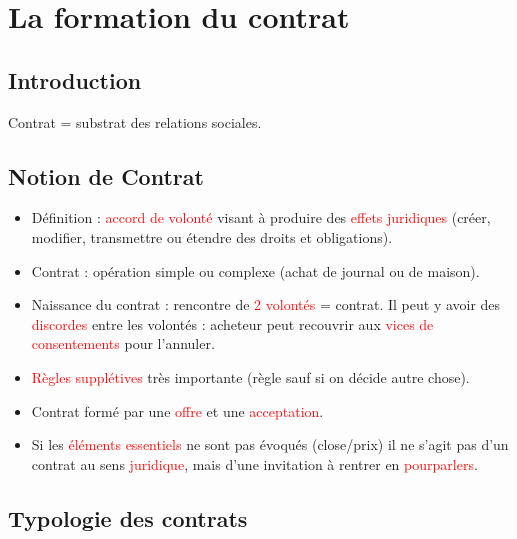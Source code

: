 \section{La formation du contrat}

\subsection{Introduction}

Contrat = substrat des relations sociales.

\subsection{Notion de Contrat}

\begin{itemize}
	\item Définition : \textcolor{red}{accord de volonté} visant à produire des \textcolor{red}{effets juridiques} (créer, modifier, transmettre ou étendre des droits et obligations).
	\item Contrat : opération simple ou complexe (achat de journal ou de maison).
	\item Naissance du contrat : rencontre de \textcolor{red}{2 volontés} = contrat. Il peut y avoir des \textcolor{red}{discordes} entre les volontés : acheteur peut recouvrir aux \textcolor{red}{vices de consentements} pour l'annuler.
	\item \textcolor{red}{Règles supplétives} très importante (règle sauf si on décide autre chose).
    \item Contrat formé par une \textcolor{red}{offre} et une \textcolor{red}{acceptation}.
    \item Si les \textcolor{red}{éléments essentiels} ne sont pas évoqués (close/prix) il ne s'agit pas d'un contrat au sens \textcolor{red}{juridique}, mais d'une invitation à rentrer en \textcolor{red}{pourparlers}.
\end{itemize}

\subsection{Typologie des contrats}

